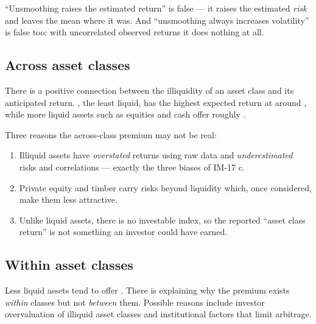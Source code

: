 \begin{imtrapbox}[breakable=false,title={The most corruptible pair of facts in the reading}]
``Unsmoothing raises the estimated return'' is false --- it raises the estimated
\emph{risk} and leaves the mean where it was. And ``unsmoothing always increases
volatility'' is false too: with uncorrelated observed returns it does nothing at
all.
\end{imtrapbox}


\subsection{Across asset classes}

There is a positive connection between the illiquidity of an asset class and its
anticipated return. , the least liquid, has the highest
expected return at around , while more liquid assets such as
equities and cash offer roughly .

\begin{imtrapbox}[breakable=false,title={The conventional view is challenged}]
Three reasons the across-class premium may not be real:
\begin{enumerate}
\item {} Illiquid assets have \emph{overstated} returns
using raw data and \emph{underestimated} risks and correlations --- exactly the
three biases of IM-17 c.
\item {} Private equity and timber carry risks beyond
liquidity which, once considered, make them less attractive.
\item {} Unlike liquid assets, there is no investable index,
so the reported ``asset class return'' is not something an investor could have
earned.
\end{enumerate}
\end{imtrapbox}

\subsection{Within asset classes}

Less liquid assets tend to offer . There is  explaining why
the premium exists \emph{within} classes but not \emph{between} them. Possible
reasons include investor overvaluation of illiquid asset classes and institutional
factors that limit arbitrage.

